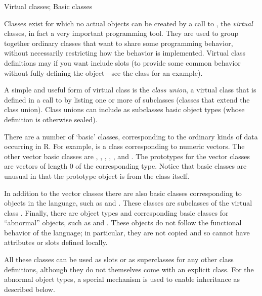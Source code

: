 %
\begin{Section}{Virtual classes; Basic classes}

Classes exist for which no actual objects can be created by a
call to , the
\emph{virtual} classes, in fact a
very important programming tool.  They are used to group together
ordinary classes that want to share some programming behavior,
without necessarily restricting how the behavior is implemented.
Virtual class definitions may if you want include
slots (to provide some common behavior without fully defining
the object---see the class  for an example).

A simple and useful form of virtual class is the \emph{class
union}, a virtual class that is defined in a call to
 by listing one or
more of subclasses (classes that extend the class union).  Class
unions can include as subclasses basic object types (whose
definition is otherwise sealed).

There are a number of `basic' classes, corresponding to the
ordinary kinds of data occurring in R.  For example,
 is a class corresponding to numeric vectors.
The other vector basic classes are , , 
, ,  , 
and .
The prototypes for
the vector classes are vectors of length 0 of the corresponding
type.  Notice that basic classes are unusual in that the
prototype object is from the class itself.

In addition to the vector classes there are also basic classes corresponding to objects in the
language, such as  and .
These classes are subclasses of the virtual class .
Finally, there are object types and corresponding basic classes for
``abnormal'' objects, such as  and
.
These objects do not follow the
functional behavior of the language; in particular, they are not
copied and so cannot have attributes or slots defined locally.

All these classes can be used as slots or as
superclasses for any other class definitions, although they do
not themselves come with an explicit class.  For the abnormal
object types, a special mechanism is used to enable inheritance
as described below.


\end{Section}
%
